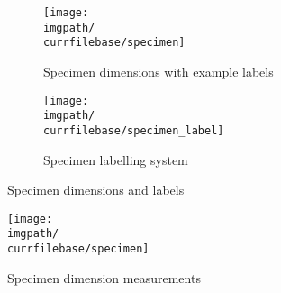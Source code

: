 \begin{figure}[!ht]
    \centering
    \begin{subfigure}[t]{\dimexpr(\distTextWidth-\distColSep)/2\relax}
        \centering
        \texttt{[image: \\imgpath/\\currfilebase/specimen]}
        \caption{Specimen dimensions with example labels}
        \label{fig:specimen_nx_dim_labels}
    \end{subfigure}%
    \hfill
    \begin{subfigure}[t]{\dimexpr(\distTextWidth-\distColSep)/2\relax}
        \centering
        \texttt{[image: \\imgpath/\\currfilebase/specimen\_label]}
        \caption{Specimen labelling system}
        \label{fig:specimen_label}
    \end{subfigure}
    \caption{Specimen dimensions and labels}
    \label{fig:specimen_dim_lab}
\end{figure}

\begin{figure}[!ht]
    \centering
    \texttt{[image: \\imgpath/\\currfilebase/specimen]}
    \caption{Specimen dimension measurements}
    \label{fig:specimen_nx_meas}
\end{figure}